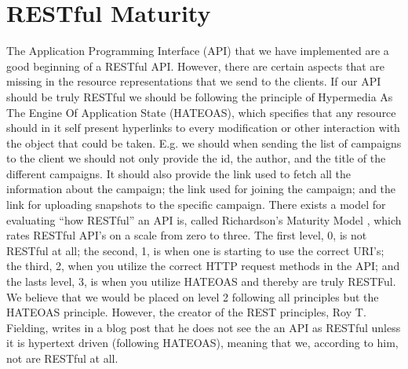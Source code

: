 
\section{RESTful Maturity}
\label{sec:restful_maturity}

The Application Programming Interface (API) that we have implemented are a good beginning of a RESTful API. However, there are certain aspects that are missing in the resource representations that we send to the clients. If our API should be truly RESTful we should be following the principle of Hypermedia As The Engine Of Application State (HATEOAS), which specifies that any resource should in it self present hyperlinks to every modification or other interaction with the object that could be taken. E.g. we should when sending the list of campaigns to the client we should not only provide the id, the author, and the title of the different campaigns. It should also provide the link used to fetch all the information about the campaign; the link used for joining the campaign; and the link for uploading snapshots to the specific campaign. There exists a model for evaluating ``how RESTful'' an API is, called Richardson's Maturity Model \parencite{richardsons_model}, which rates RESTful API's on a scale from zero to three. The first level, 0, is not RESTful at all; the second, 1, is when one is starting to use the correct URI's; the third, 2, when you utilize the correct HTTP request methods in the API; and the lasts level, 3, is when you utilize HATEOAS and thereby are truly RESTFul. We believe that we would be placed on level 2 following all principles but the HATEOAS principle. However, the creator of the REST principles, Roy T. Fielding, writes in a blog post that he does not see the an API as RESTful unless it is hypertext driven (following HATEOAS)\parencite{http_manden_blog}, meaning that we, according to him, not are RESTful at all. 